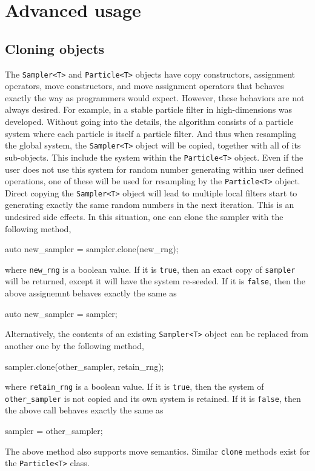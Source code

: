 \chapter{Advanced usage}
\label{chap:Advanced usage}

\section{Cloning objects}
\label{sec:Cloning objects}

The \verb|Sampler<T>| and \verb|Particle<T>| objects have copy constructors,
assignment operators, move constructors, and move assignment operators that
behaves exactly the way as \cpp programmers would expect. However, these
behaviors are not always desired. For example, in \textcite{stpf} a stable
particle filter in high-dimensions was developed. Without going into the
details, the algorithm consists of a particle system where each particle is
itself a particle filter. And thus when resampling the global system, the
\verb|Sampler<T>| object will be copied, together with all of its sub-objects.
This include the \rng system within the \verb|Particle<T>| object. Even if the
user does not use this \rng system for random number generating within user
defined operations, one of these \rng will be used for resampling by the
\verb|Particle<T>| object. Direct copying the \verb|Sampler<T>| object will
lead to multiple local filters start to generating exactly the same random
numbers in the next iteration. This is an undesired side effects. In this
situation, one can clone the sampler with the following method,
\begin{cppcode}
  auto new_sampler = sampler.clone(new_rng);
\end{cppcode}
where \verb|new_rng| is a boolean value. If it is \verb|true|, then an exact
copy of \verb|sampler| will be returned, except it will have the \rng system
re-seeded. If it is \verb|false|, then the above assignemnt behaves exactly the
same as
\begin{cppcode}
  auto new_sampler = sampler;
\end{cppcode}
Alternatively, the contents of an existing \verb|Sampler<T>| object can be
replaced from another one by the following method,
\begin{cppcode}
  sampler.clone(other_sampler, retain_rng);
\end{cppcode}
where \verb|retain_rng| is a boolean value. If it is \verb|true|, then the \rng
system of \verb|other_sampler| is not copied and its own \rng system is
retained. If it is \verb|false|, then the above call behaves exactly the same
as
\begin{cppcode}
  sampler = other_sampler;
\end{cppcode}
The above method also supports move semantics. Similar \verb|clone| methods
exist for the \verb|Particle<T>| class.

